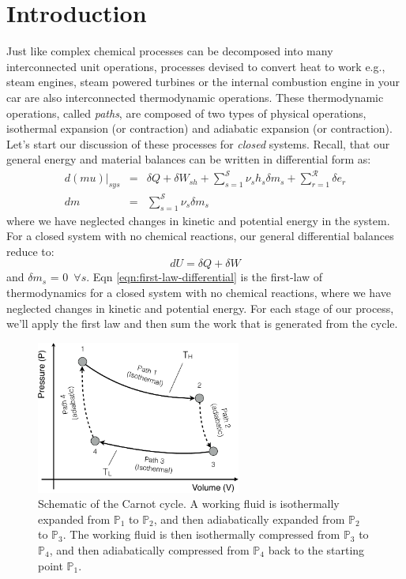 \documentclass[11pt]{article}
\theoremstyle{definition}
\begin{document}
\clearpage

\section*{Introduction}
Just like complex chemical processes can be decomposed into many interconnected unit operations,
processes devised to convert heat to work e.g., steam engines, steam powered turbines or the internal combustion engine in your car
are also interconnected thermodynamic operations. These thermodynamic operations, called \textit{paths}, are composed of two types of physical operations, isothermal expansion (or contraction) and adiabatic expansion (or contraction). Let's start our discussion of these processes for \textit{closed} systems. Recall, that our general energy and material balances can be written in
differential form as:
\begin{eqnarray}\label{eqn:energy-balance-precursor-internal}
d\left(mu\right)\Bigr|_{sys} &=& \delta{Q}+\delta{W}_{sh}+\sum_{s=1}^{\mathcal{S}}\nu_{s}h_{s}\delta{m}_{s} + \sum_{r=1}^{\mathcal{R}}\delta e_{r}\\\label{eqn:material-balance-precursor-internal}
dm &=& \sum_{s=1}^{\mathcal{S}}\nu_{s}\delta{m}_{s}
\end{eqnarray}where we have neglected changes in kinetic and potential energy in the system. For a closed system with no chemical reactions, our general differential balances reduce to:
\begin{equation}\label{eqn:first-law-differential}
dU = \delta{Q}+\delta{W}
\end{equation}and $\delta{m}_{s}$ = 0~$\forall{s}$. Eqn \eqref{eqn:first-law-differential} is the first-law of thermodynamics for a closed system with no chemical reactions,
where we have neglected changes in kinetic and potential energy. For each stage of our process, we'll apply the first law and then sum the work that is generated from the cycle.

\begin{figure}[!ht]\centering
\includegraphics[width=0.6\textwidth]{./figs/CarnotCycle.pdf}
\caption{Schematic of the Carnot cycle. A working fluid is isothermally expanded from $\mathbb{P}_1$ to $\mathbb{P}_2$, and then adiabatically expanded from $\mathbb{P}_2$ to $\mathbb{P}_3$. The working fluid is then isothermally compressed from $\mathbb{P}_3$ to $\mathbb{P}_4$, and then adiabatically compressed from $\mathbb{P}_4$ back to the starting point $\mathbb{P}_1$.}\label{fig-carnot-cycle}
\end{figure}
\end{document}
